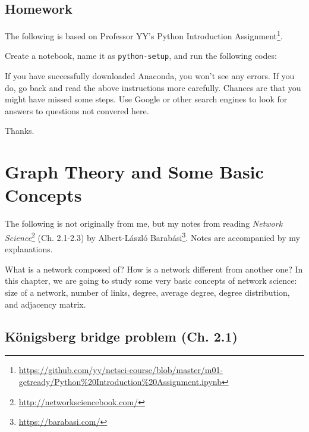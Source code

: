 \documentclass[
]{krantz}
\makeatletter
\newenvironment{Shaded}{\begin{snugshade}}{\end{snugshade}}
\newcommand{\ImportTok}[1]{#1}
\newcommand{\NormalTok}[1]{#1}
\newcommand{\OperatorTok}[1]{\textcolor[rgb]{0.43,0.43,0.43}{\textbf{#1}}}
\renewcommand{\href}[2]{#2\footnote{\url{#1}}}
\newenvironment{kframe}{%
\medskip{}
\setlength{\fboxsep}{.8em}
 \def\at@end@of@kframe{}%
 \ifinner\ifhmode%
  \def\at@end@of@kframe{\end{minipage}}%
  \begin{minipage}{\columnwidth}%
 \fi\fi%
 \def\FrameCommand##1{\hskip\@totalleftmargin \hskip-\fboxsep
 \colorbox{shadecolor}{##1}\hskip-\fboxsep
     \hskip-\linewidth \hskip-\@totalleftmargin \hskip\columnwidth}%
 \MakeFramed {\advance\hsize-\width
   \@totalleftmargin\z@ \linewidth\hsize
   \@setminipage}}%
 {\par\unskip\endMakeFramed%
 \at@end@of@kframe}
\renewenvironment{Shaded}{\begin{kframe}}{\end{kframe}}
\newenvironment{rmdblock}[1]
  {
  \begin{itemize}
  \renewcommand{\labelitemi}{
    \raisebox{-.7\height}[0pt][0pt]{
      {\setkeys{Gin}{width=3em,keepaspectratio}\texttt{[image: images/\#1]}}
    }
  }
  \setlength{\fboxsep}{1em}
  \begin{kframe}
  \item
  }
  {
  \end{kframe}
  \end{itemize}
  }
\newenvironment{rmdnote}
  {\begin{rmdblock}{note}}
  {\end{rmdblock}}
\makeatother
\begin{document}
\hypertarget{homework}{%
\section{Homework}\label{homework}}

\begin{rmdnote}
The following is based on Professor YY's \href{https://github.com/yy/netsci-course/blob/master/m01-getready/Python\%20Introduction\%20Assignment.ipynb}{Python Introduction Assignment}.
\end{rmdnote}

Create a notebook, name it as \texttt{python-setup}, and run the following codes:

\begin{Shaded}
\end{Shaded}

If you have successfully downloaded Anaconda, you won't see any errors. If you do, go back and read the above instructions more carefully. Chances are that you might have missed some steps. Use Google or other search engines to look for answers to questions not convered here.

Thanks.

\hypertarget{Graph}{%
\chapter{Graph Theory and Some Basic Concepts}\label{Graph}}

\begin{rmdnote}
The following is not originally from me, but my notes from reading \href{http://networksciencebook.com/}{\emph{Network Science}} (Ch. 2.1-2.3) by \href{https://barabasi.com/}{Albert-László Barabási}. Notes are accompanied by my explanations.
\end{rmdnote}

What is a network composed of? How is a network different from another one? In this chapter, we are going to study some very basic concepts of network science: size of a network, number of links, degree, average degree, degree distribution, and adjacency matrix.

\hypertarget{kuxf6nigsberg-bridge-problem-ch.-2.1}{%
\section{Königsberg bridge problem (Ch. 2.1)}\label{kuxf6nigsberg-bridge-problem-ch.-2.1}}
\end{document}
